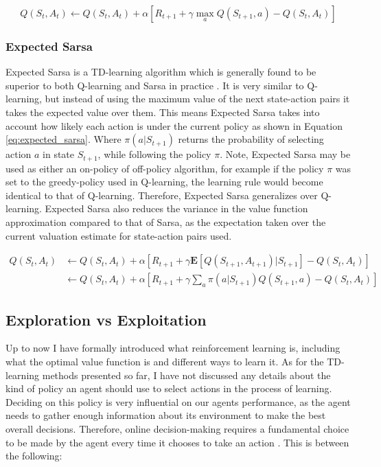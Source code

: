 \documentclass[../dissertation.tex]{subfiles}
\begin{document}
\begin{equation}
Q(S_t, A_t) \leftarrow Q(S_t, A_t) + \alpha[R_{t+1} + \gamma \max_aQ(S_{t+1}, a) - Q(S_t, A_t)]
\end{equation}

\subsubsection{Expected Sarsa}

Expected Sarsa is a TD-learning algorithm which is generally found to be superior to both Q-learning and Sarsa in practice \cite{sutton2011reinforcement}. It is very similar to Q-learning, but instead of using the maximum value of the next state-action pairs it takes the expected value over them. This means Expected Sarsa takes into account how likely each action is under the current policy as shown in Equation \ref{eq:expected_sarsa}. Where $\pi(a | S_{t+1})$ returns the probability of selecting action $a$ in state $S_{t+1}$, while following the policy $\pi$. Note, Expected Sarsa may be used as either an on-policy of off-policy algorithm, for example if the policy $\pi$ was set to the greedy-policy used in Q-learning, the learning rule would become identical to that of Q-learning. Therefore, Expected Sarsa generalizes over Q-learning. Expected Sarsa also reduces the variance in the value function approximation compared to that of Sarsa, as the expectation taken over the current valuation estimate for state-action pairs used.

\begin{align}
Q(S_t, A_t) &  \leftarrow Q(S_t, A_t) + \alpha [R_{t+1} + \gamma \mathbf{E}[Q(S_{t+1}, A_{t+1}) | S_{t+1}] - Q(S_t, A_t)]\\
 & \leftarrow Q(S_t, A_t) + \alpha [R_{t+1} + \gamma \sum_a \pi(a| S_{t+1}) Q(S_{t+1}, a) - Q(S_t, A_t)]
 \label{eq:expected_sarsa}
\end{align}

\subsection{Exploration vs Exploitation}
\label{sec:exploration_vs_exploitation}

Up to now I have formally introduced what reinforcement learning is, including what the optimal value function is and different ways to learn it. As for the TD-learning methods presented so far, I have not discussed any details about the kind of policy an agent should use to select actions in the process of learning. Deciding on this policy is very influential on our agents performance, as the agent needs to gather enough information about its environment to make the best overall decisions. Therefore, online decision-making requires a fundamental choice to be made by the agent every time it chooses to take an action \cite{exploration_vs_exploitation}. This is between the following:
\end{document}
